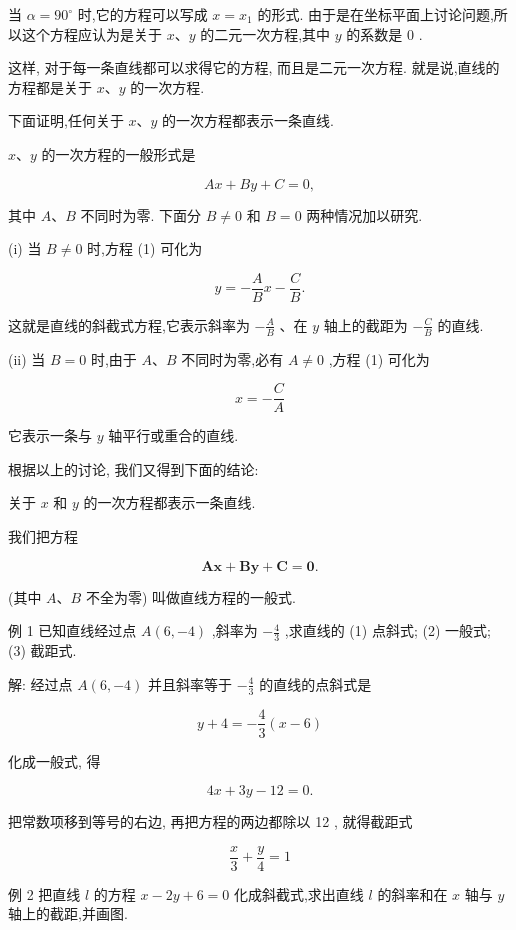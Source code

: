 \documentclass[lang=cn,newtx,10pt,scheme=chinese]{elegantbook}
\begin{document}
当 \(\alpha = {90}^{ \circ }\) 时,它的方程可以写成 \(x = {x}_{1}\) 的形式. 由于是在坐标平面上讨论问题,所以这个方程应认为是关于 \(x\text{、}y\) 的二元一次方程,其中 \(y\) 的系数是 0 .

这样, 对于每一条直线都可以求得它的方程, 而且是二元一次方程. 就是说,直线的方程都是关于 \(x\text{、}y\) 的一次方程.

下面证明,任何关于 \(x\text{、}y\) 的一次方程都表示一条直线.

\(x\text{、}y\) 的一次方程的一般形式是

\[
    {Ax} + {By} + C = 0, \tag{1}
\]

其中 \(A\text{、}B\) 不同时为零. 下面分 \(B \neq 0\) 和 \(B = 0\) 两种情况加以研究.

(i) 当 \(B \neq 0\) 时,方程 (1) 可化为

\[
  y = - \frac{A}{B}x - \frac{C}{B}.
\]

这就是直线的斜截式方程,它表示斜率为 \(- \frac{A}{B}\) 、在 \(y\) 轴上的截距为 \(- \frac{C}{B}\) 的直线.

(ii) 当 \(B = 0\) 时,由于 \(A\text{、}B\) 不同时为零,必有 \(A \neq 0\) ,方程 (1) 可化为

\[
  x = - \frac{C}{A}
\]

它表示一条与 \(y\) 轴平行或重合的直线.

根据以上的讨论, 我们又得到下面的结论:

关于 \(x\) 和 \(y\) 的一次方程都表示一条直线.

我们把方程

\[
  \mathbf{A}\mathbf{x} + \mathbf{B}\mathbf{y} + \mathbf{C} = \mathbf{0}. \tag{1}
\]

(其中 \(A\text{、}B\) 不全为零) 叫做直线方程的一般式.

例 1 已知直线经过点 \(A\left( {6, - 4}\right)\) ,斜率为 \(- \frac{4}{3}\) ,求直线的 (1) 点斜式; (2) 一般式; (3) 截距式.

解: 经过点 \(A\left( {6, - 4}\right)\) 并且斜率等于 \(- \frac{4}{3}\) 的直线的点斜式是

\[
  y + 4 = - \frac{4}{3}\left( {x - 6}\right)
\]

化成一般式, 得

\[
    {4x} + {3y} - {12} = 0.
\]

把常数项移到等号的右边, 再把方程的两边都除以 12 , 就得截距式

\[
  \frac{x}{3} + \frac{y}{4} = 1
\]

例 2 把直线 \(l\) 的方程 \(x - {2y} + 6 = 0\) 化成斜截式,求出直线 \(l\) 的斜率和在 \(x\) 轴与 \(y\) 轴上的截距,并画图.
\end{document}
